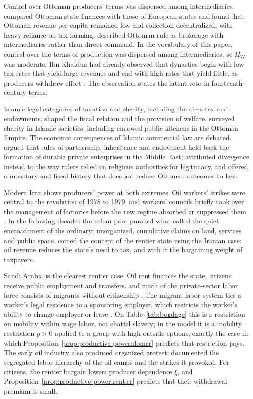 \documentclass[11pt,letterpaper]{article}
\theoremstyle{definition}
\theoremstyle{remark}
\newcommand{\pW}{\mathsf{W}}
\newcommand{\HW}{H_{\pW}}
\begin{document}
Control over Ottoman producers' terms was dispersed among intermediaries. \citet{karaman2010} compared Ottoman state finances with those of European states and found that Ottoman revenue per capita remained low and collection decentralized, with heavy reliance on tax farming. \citet{barkey2008} described Ottoman rule as brokerage with intermediaries rather than direct command. In the vocabulary of this paper, control over the terms of production was dispersed among intermediaries, so $\HW$ was moderate. Ibn Khaldun had already observed that dynasties begin with low tax rates that yield large revenues and end with high rates that yield little, as producers withdraw effort \citep{khaldun1958}. The observation states the latent veto in fourteenth-century terms.

Islamic legal categories of taxation and charity, including the alms tax and endowments, shaped the fiscal relation and the provision of welfare. \citet{singer2008} surveyed charity in Islamic societies, including endowed public kitchens in the Ottoman Empire. The economic consequences of Islamic commercial law are debated. \citet{kuran2011} argued that rules of partnership, inheritance and endowment held back the formation of durable private enterprises in the Middle East; \citet{rubin2017} attributed divergence instead to the way rulers relied on religious authorities for legitimacy, and \citet{pamuk2000} offered a monetary and fiscal history that does not reduce Ottoman outcomes to law.

Modern Iran shows producers' power at both extremes. Oil workers' strikes were central to the revolution of 1978 to 1979, and workers' councils briefly took over the management of factories before the new regime absorbed or suppressed them \citep{bayat1987}. In the following decades the urban poor pursued what \citet{bayat1997} called the quiet encroachment of the ordinary: unorganized, cumulative claims on land, services and public space. \citet{mahdavy1970} coined the concept of the rentier state using the Iranian case: oil revenue reduces the state's need to tax, and with it the bargaining weight of taxpayers.

Saudi Arabia is the clearest rentier case. Oil rent finances the state, citizens receive public employment and transfers, and much of the private-sector labor force consists of migrants without citizenship \citep{chaudhry1997,hertog2010}. The migrant labor system ties a worker's legal residence to a sponsoring employer, which restricts the worker's ability to change employer or leave \citep{hanieh2011,kapiszewski2001}. On Table~\ref{tab:bondage} this is a restriction on mobility within wage labor, not chattel slavery; in the model it is a mobility restriction $g>0$ applied to a group with high outside options, exactly the case in which Proposition~\ref{prop:productive-power:domar} predicts that restriction pays. The early oil industry also produced organized protest: \citet{vitalis2007} documented the segregated labor hierarchy of the oil camps and the strikes it provoked. For citizens, the rentier bargain lowers producer dependence $\xi$, and Proposition~\ref{prop:productive-power:rentier} predicts that their withdrawal premium is small.
\end{document}
